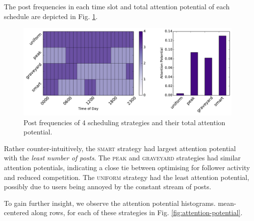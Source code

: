\documentclass[onesided,asymmetric]{tufte-book}
\begin{document}
The post frequencies in each time slot and total attention potential of each schedule are depicted in Fig. \ref{fig:performance}.

\begin{figure}
    \includegraphics[width=\linewidth]{schedule_performance}
    \caption[Post frequencies and attention potential of the selected scheduling strategies.]{Post frequencies of 4 scheduling strategies and their total attention potential.}
    \label{fig:performance}
\end{figure}

Rather counter-intuitively, the \textsc{smart} strategy had largest attention potential with the \textit{least number of posts}. The \textsc{peak} and \textsc{graveyard} strategies had similar attention potentials, indicating a close tie between optimising for follower activity and reduced competition. The \textsc{uniform} strategy had the least attention potential, possibly due to users being annoyed by the constant stream of posts.

To gain further insight, we observe the attention potential histograms. mean-centered along rows, for each of these strategies in Fig. \ref{fig:attention-potential}.
\end{document}
